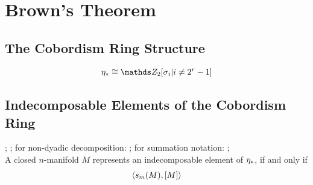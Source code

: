 % 

\chapter{Brown's Theorem}

\section{The Cobordism Ring Structure}

\begin{LemDef} %
\end{LemDef}

\begin{Thm} %
  \begin{gather*}
    \c_* \cong \Zmod2[\sigma_i| i\neq 2^r-1]
  \end{gather*}
\end{Thm}


\section{Indecomposable Elements of the Cobordism Ring}

\begin{Def}[Classes $s_I(M)$]
\end{Def}

\begin{Thm}
  ;
  ;
  for non-dyadic decomposition: ;
  for summation notation: ;
  \\
  A closed $n$-manifold $M$ represents an indecomposable element of
  $\eta_*$, if and only if
  \begin{gather*}
    \langle s_m(M), [M] \rangle
  \end{gather*}
\end{Thm}

